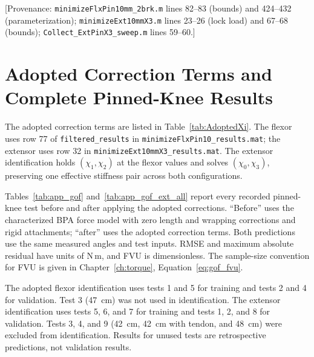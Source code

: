 [Provenance: \nolinkurl{minimizeFlxPin10mm_2brk.m} lines 82--83 (bounds) and 424--432 (parameterization); \nolinkurl{minimizeExt10mmX3.m} lines 23--26 (lock load) and 67--68 (bounds); \nolinkurl{Collect_ExtPinX3_sweep.m} lines 59--60.]

\section{Adopted Correction Terms and Complete Pinned-Knee Results}

The adopted correction terms are listed in Table~\ref{tab:AdoptedXi}. The flexor uses row 77 of \texttt{filtered\_results} in \nolinkurl{minimizeFlxPin10_results.mat}; the extensor uses row 32 in \nolinkurl{minimizeExt10mmX3_results.mat}. The extensor identification holds $(\chi_1,\chi_2)$ at the flexor values and solves $(\chi_0,\chi_3)$, preserving one effective stiffness pair across both configurations.

Tables~\ref{tab:app_gof} and~\ref{tab:app_gof_ext_all} report every recorded pinned-knee test before and after applying the adopted corrections. ``Before'' uses the characterized BPA force model with zero length and wrapping corrections and rigid attachments; ``after'' uses the adopted correction terms. Both predictions use the same measured angles and test inputs. RMSE and maximum absolute residual have units of N\,m, and FVU is dimensionless. The sample-size convention for FVU is given in Chapter~\ref{ch:torque}, Equation~\eqref{eq:gof_fvu}.

The adopted flexor identification uses tests 1 and 5 for training and tests 2 and 4 for validation. Test 3 (\qty{47}{\cm}) was not used in identification. The extensor identification uses tests 5, 6, and 7 for training and tests 1, 2, and 8 for validation. Tests 3, 4, and 9 (\qty{42}{\cm}, \qty{42}{\cm} with tendon, and \qty{48}{\cm}) were excluded from identification. Results for unused tests are retrospective predictions, not validation results.


